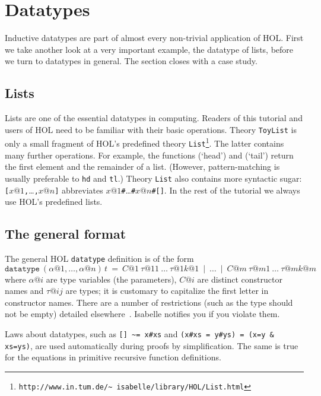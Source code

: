 \section{Datatypes}
\label{sec:datatype}

Inductive datatypes are part of almost every non-trivial application of HOL.
First we take another look at a very important example, the datatype of
lists, before we turn to datatypes in general. The section closes with a
case study.


\subsection{Lists}

Lists are one of the essential datatypes in computing. Readers of this tutorial
and users of HOL need to be familiar with their basic operations. Theory
\texttt{ToyList} is only a small fragment of HOL's predefined theory
\texttt{List}\footnote{\texttt{http://www.in.tum.de/\~\relax
    isabelle/library/HOL/List.html}}.
The latter contains many further operations. For example, the functions
 (`head') and  (`tail') return the first
element and the remainder of a list. (However, pattern-matching is usually
preferable to \texttt{hd} and \texttt{tl}.)
Theory \texttt{List} also contains more syntactic sugar:
\texttt{[}$x@1$\texttt{,}\dots\texttt{,}$x@n$\texttt{]} abbreviates
$x@1$\texttt{\#}\dots\texttt{\#}$x@n$\texttt{\#[]}.
In the rest of the tutorial we always use HOL's predefined lists.


\subsection{The general format}
\label{sec:general-datatype}

The general HOL \texttt{datatype} definition is of the form
\[
\mathtt{datatype}~(\alpha@1, \dots, \alpha@n) \, t ~=~
C@1~\tau@{11}~\dots~\tau@{1k@1} ~\mid~ \dots ~\mid~
C@m~\tau@{m1}~\dots~\tau@{mk@m}
\]
where $\alpha@i$ are type variables (the parameters), $C@i$ are distinct
constructor names and $\tau@{ij}$ are types; it is customary to capitalize
the first letter in constructor names. There are a number of
restrictions (such as the type should not be empty) detailed
elsewhere~\cite{Isa-Logics-Man}. Isabelle notifies you if you violate them.

Laws about datatypes, such as \verb$[] ~= x#xs$ and \texttt{(x\#xs = y\#ys) =
  (x=y \& xs=ys)}, are used automatically during proofs by simplification.
The same is true for the equations in primitive recursive function
definitions.

